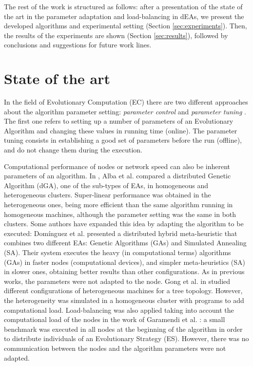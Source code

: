 \documentclass[final,1p,times]{elsarticle}
\begin{document}
The rest of the work is structured as follows: after a presentation of
the state of
the art in the parameter adaptation and load-balancing in dEAs, %
 we present the developed algorithms and experimental setting (Section \ref{sec:experiments}). 
Then, the results of the experiments are shown (Section \ref{sec:results}), followed by conclusions and suggestions for future work lines.


%
\section{State of the art}
\label{sec:soa}
%

In the field of  Evolutionary Computation (EC) there are two different approaches about the algorithm parameter setting: {\em parameter control} and {\em parameter tuning} \cite{PARAMETERTUNING}. The first one refers to setting up a number of parameters of an Evolutionary Algorithm  and changing these values in running time (online). The parameter tuning consists in establishing a good set of parameters before the run (offline), and do not change them during the execution.

 Computational performance of nodes or network speed can also be inherent parameters of an algorithm. In \cite{HETEROGENEOUSHARD}, Alba et al. compared a distributed Genetic Algorithm (dGA), one of the sub-types of EAs, in homogeneous and heterogeneous clusters. Super-linear performance was obtained in the heterogeneous ones, being more efficient than the same algorithm running in homogeneous machines, although the parameter setting was the same in both clusters. Some authors have expanded this idea by adapting the algorithm to be executed: Dom\'inguez et al. \cite{HYDROCM} presented a distributed hybrid meta-heuristic that combines two different EAs: Genetic Algorithms (GAs) and Simulated Annealing (SA). Their system executes the heavy (in computational terms) algorithms (GAs) in faster nodes (computational devices), and simpler meta-heuristics (SA) in slower ones, obtaining better results than other configurations. As in previous works, the parameters were not adapted to the node. Gong et al. in \cite{HETEROGENEOUSTOPOLOGY} studied different configurations of heterogeneous machines for a tree topology. However, the heterogeneity was simulated in a homogeneous cluster with programs to add computational load. Load-balancing was also applied taking into account the computational load of the nodes in the work of Garamendi et al. \cite{PARALLELIMPLEMENTATION}: a small benchmark was executed in all nodes at the beginning of the algorithm in order to distribute individuals of an Evolutionary Strategy (ES). However, there was no communication between the nodes and the algorithm parameters were not adapted. 
\end{document}
